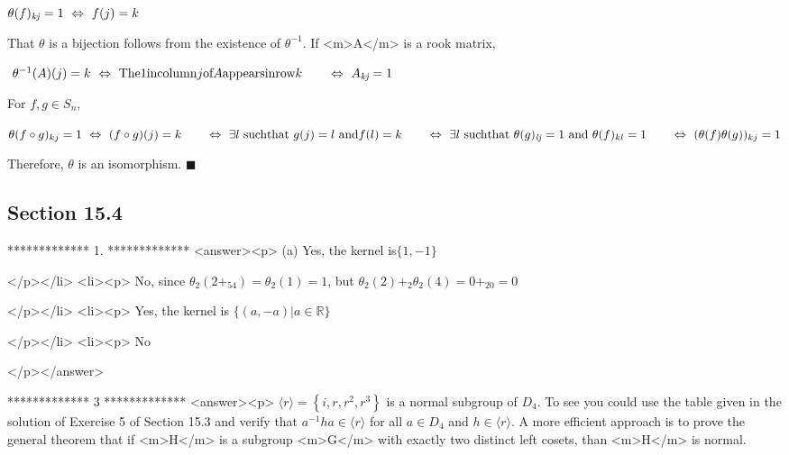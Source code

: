 \(\theta (f)_{\text{\textit{kj}}}=1\text{   }\Leftrightarrow \text{     }f(j)=k\)



That $\theta $ is a bijection follows from the existence of \(\theta ^{-1}\).   If <m>A</m> is a rook matrix, 



\(\text{  }\theta ^{-1}(A)(j)=k\text{  }\Leftrightarrow \text{   }\text{The} 1 \text{in} \text{column} j \text{of} A \text{appears} \text{in}
\text{row} k \quad \quad \Leftrightarrow \text{  }\text{\textit{$A_{\text{kj}}$}}=1\) 



For \(f,g\in  S_n\), 



   \(\theta (f\circ g)_{k j}= 1\text{  }\Leftrightarrow \text{   }(f \circ g)(j)=k\\
\\
\quad \quad \Leftrightarrow \text{  }\exists  l\text{  }\text{such} \text{that}\text{  }g(j)=l\text{  }\text{and} f(l)=k\\
\\
\quad \quad \Leftrightarrow \text{  }\exists  l\text{  }\text{such} \text{that}\text{  }\theta (g)_{\text{\textit{lj}}}=1\text{   }\text{and}\text{
 }\theta (f)_{k l}=1\\
\\
\quad \quad \Leftrightarrow \text{  }(\theta (f)\theta (g))_{k j}=1\)



Therefore,  $\theta $ is an isomorphism. \(\blacksquare\)


\subsection{Section 15.4}

*************
1.
*************
<answer><p> (a)  Yes, the kernel is\(\{1, -1\}\)

</p></li>
<li><p> No, since \(\theta _2\left(2 +_54\right)= \theta _2(1)=1\), but  \(\theta _2(2)+_2\theta _2(4)=0+_20 =0\)

</p></li>
<li><p> Yes, the kernel is \(\{(a, -a)| a \in \mathbb{R}\}\)

</p></li>
<li><p>  No

</p></answer>


*************
3
*************
<answer><p>  \(\langle r\rangle =\left\{i,r,r^2,r^3\right\}\) is a normal subgroup of \(D_4\). To see you could use the table given in the solution of Exercise
5 of Section 15.3 and verify that  \(a^{-1}h a \in \langle r\rangle\) for all \(a\in D_4\) and \(h\in \langle r\rangle\).   A more efficient
approach is to prove the general theorem that if <m>H</m> is a subgroup <m>G</m> with exactly two distinct left cosets, than <m>H</m> is
normal.  



